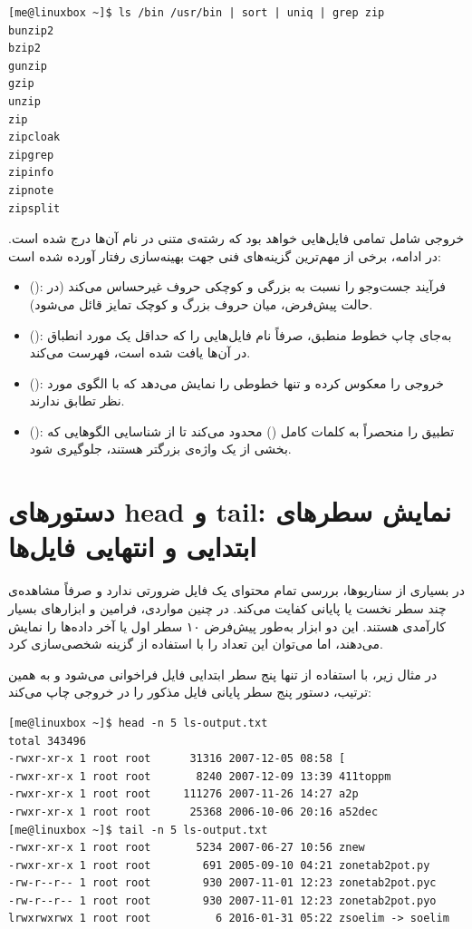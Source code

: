 \begin{latin}
\begin{lstlisting}
[me@linuxbox ~]$ ls /bin /usr/bin | sort | uniq | grep zip
bunzip2
bzip2
gunzip
gzip
unzip
zip
zipcloak
zipgrep
zipinfo
zipnote
zipsplit
\end{lstlisting}
\end{latin}

خروجی شامل تمامی فایل‌هایی خواهد بود که رشته‌ی متنی  در نام آن‌ها درج شده است. در ادامه، برخی از مهم‌ترین گزینه‌های فنی جهت بهینه‌سازی رفتار  آورده شده است:

\begin{itemize}
  \item {} (): فرآیند جست‌وجو را نسبت به بزرگی و کوچکی حروف غیرحساس می‌کند (در حالت پیش‌فرض،  میان حروف بزرگ و کوچک تمایز قائل می‌شود).
  \item {} (): به‌جای چاپ خطوط منطبق، صرفاً نام فایل‌هایی را که حداقل یک مورد انطباق در آن‌ها یافت شده است، فهرست می‌کند.
  \item {} (): خروجی را معکوس کرده و تنها خطوطی را نمایش می‌دهد که با الگوی مورد نظر تطابق ندارند.
  \item {} (): تطبیق را منحصراً به کلمات کامل () محدود می‌کند تا از شناسایی الگوهایی که بخشی از یک واژه‌ی بزرگتر هستند، جلوگیری شود.
\end{itemize}

\section{دستورهای head و tail: نمایش سطرهای ابتدایی و انتهایی فایل‌ها}

در بسیاری از سناریوها، بررسی تمام محتوای یک فایل ضرورتی ندارد و صرفاً مشاهده‌ی چند سطر نخست یا پایانی کفایت می‌کند. در چنین مواردی، فرامین  و  ابزارهای بسیار کارآمدی هستند. این دو ابزار به‌طور پیش‌فرض ۱۰ سطر اول یا آخر داده‌ها را نمایش می‌دهند، اما می‌توان این تعداد را با استفاده از گزینه  شخصی‌سازی کرد.

در مثال زیر، با استفاده از  تنها پنج سطر ابتدایی فایل  فراخوانی می‌شود و به همین ترتیب، دستور  پنج سطر پایانی فایل مذکور را در خروجی چاپ می‌کند:

\begin{latin}
\begin{lstlisting}
[me@linuxbox ~]$ head -n 5 ls-output.txt
total 343496
-rwxr-xr-x 1 root root      31316 2007-12-05 08:58 [
-rwxr-xr-x 1 root root       8240 2007-12-09 13:39 411toppm
-rwxr-xr-x 1 root root     111276 2007-11-26 14:27 a2p
-rwxr-xr-x 1 root root      25368 2006-10-06 20:16 a52dec
[me@linuxbox ~]$ tail -n 5 ls-output.txt
-rwxr-xr-x 1 root root       5234 2007-06-27 10:56 znew
-rwxr-xr-x 1 root root        691 2005-09-10 04:21 zonetab2pot.py
-rw-r--r-- 1 root root        930 2007-11-01 12:23 zonetab2pot.pyc
-rw-r--r-- 1 root root        930 2007-11-01 12:23 zonetab2pot.pyo
lrwxrwxrwx 1 root root          6 2016-01-31 05:22 zsoelim -> soelim
\end{lstlisting}
\end{latin}

